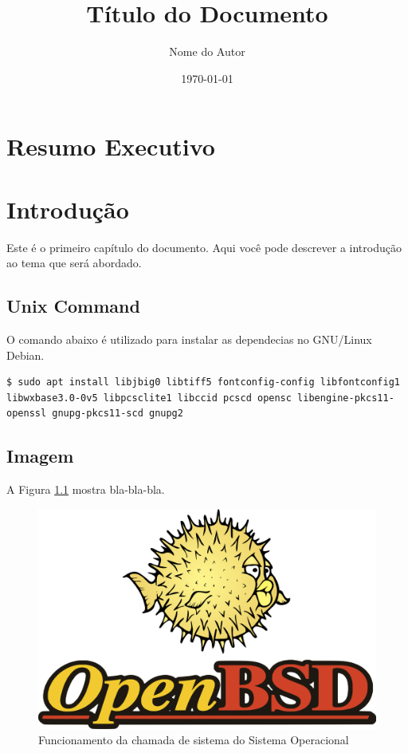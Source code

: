 \documentclass[a4paper,12pt]{report}
\title{\Huge{\textbf{Título do Documento}}}
\author{\Large{Nome do Autor}}
\date{\Large{\today}}
\begin{document}
\begin{titlepage}
    \maketitle
    \thispagestyle{empty} %
\end{titlepage}

\chapter*{Resumo Executivo}
\lipsum[1-2]
\clearpage

\tableofcontents
\clearpage

\chapter{Introdução}
Este é o primeiro capítulo do documento. Aqui você pode descrever a introdução ao tema que será abordado.

\section{Unix Command}
O comando abaixo é utilizado para instalar as dependecias no GNU/Linux Debian.

\begin{tcolorbox}[title=Comando OpenSSL]
\begin{Verbatim}
$ sudo apt install libjbig0 libtiff5 fontconfig-config libfontconfig1 libwxbase3.0-0v5 libpcsclite1 libccid pcscd opensc libengine-pkcs11-openssl gnupg-pkcs11-scd gnupg2
\end{Verbatim}
\end{tcolorbox}

\section{Imagem}
A Figura \ref{fig:openbsd} mostra bla-bla-bla.

\begin{figure}[H]
    \centering
    \includegraphics[scale=0.10]{img/openbsd.png}
    \caption{Funcionamento da chamada de sistema do Sistema Operacional}
    \label{fig:openbsd}
\end{figure}
\end{document}
